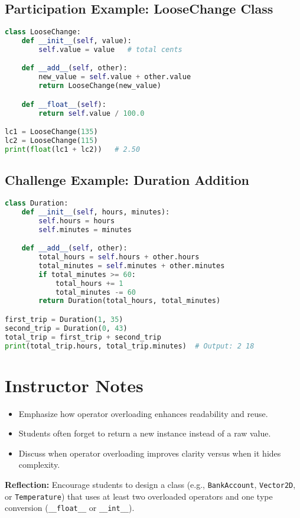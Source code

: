 \subsection*{Participation Example: LooseChange Class}

\begin{lstlisting}[language=Python, caption={A simple numeric class using operator overloading}]
class LooseChange:
    def __init__(self, value):
        self.value = value   # total cents

    def __add__(self, other):
        new_value = self.value + other.value
        return LooseChange(new_value)

    def __float__(self):
        return self.value / 100.0

lc1 = LooseChange(135)
lc2 = LooseChange(115)
print(float(lc1 + lc2))   # 2.50
\end{lstlisting}

\subsection*{Challenge Example: Duration Addition}

\begin{lstlisting}[language=Python, caption={Operator overloading for adding durations}]
class Duration:
    def __init__(self, hours, minutes):
        self.hours = hours
        self.minutes = minutes

    def __add__(self, other):
        total_hours = self.hours + other.hours
        total_minutes = self.minutes + other.minutes
        if total_minutes >= 60:
            total_hours += 1
            total_minutes -= 60
        return Duration(total_hours, total_minutes)

first_trip = Duration(1, 35)
second_trip = Duration(0, 43)
total_trip = first_trip + second_trip
print(total_trip.hours, total_trip.minutes)  # Output: 2 18
\end{lstlisting}

\section{Instructor Notes}

\begin{itemize}
  \item Emphasize how operator overloading enhances readability and reuse.
  \item Students often forget to return a new instance instead of a raw value.
  \item Discuss when operator overloading improves clarity versus when it hides complexity.
\end{itemize}

\bigskip
\noindent
\textbf{Reflection:}  
Encourage students to design a class (e.g., \texttt{BankAccount}, \texttt{Vector2D}, or \texttt{Temperature})  
that uses at least two overloaded operators and one type conversion (\texttt{\_\_float\_\_} or \texttt{\_\_int\_\_}).


